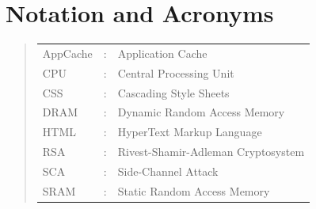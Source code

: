 \documentclass[10pt,a4paper,twoside]{book}
\begin{document}

\chapter*{Notation and Acronyms}




\begin{quote}
\noindent
\begin{tabular}{lcl}

AppCache		   	 	&:	   & Application Cache   									 \\	
CPU					&:	   & Central Processing Unit									 \\
CSS					&:	   & Cascading Style Sheets									 \\
DRAM					&:	   & Dynamic Random Access Memory							 \\
HTML					&:     & HyperText Markup Language								 \\
RSA					&:	   & Rivest-Shamir-Adleman Cryptosystem				    		 \\
SCA					&:	   & Side-Channel Attack										 \\	
SRAM					&:	   & Static Random Access Memory								 \\
\end{tabular}
\end{quote}
\end{document}

